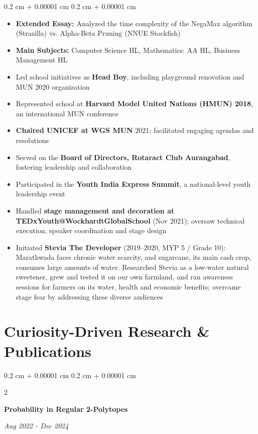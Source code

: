 \documentclass[10pt, letterpaper]{article}
\newenvironment{highlights}{
    \begin{itemize}[
        topsep=0.10 cm,
        parsep=0.10 cm,
        partopsep=0pt,
        itemsep=0pt,
        leftmargin=0.4 cm + 10pt
    ]
}{
    \end{itemize}
} %
\newenvironment{onecolentry}{
    \begin{adjustwidth}{
        0.2 cm + 0.00001 cm
    }{
        0.2 cm + 0.00001 cm
    }
}{
    \end{adjustwidth}
} %
\newenvironment{twocolentry}[2][]{
    \onecolentry
    \def\secondColumn{#2}
    \setcolumnwidth{\fill, 4.5 cm}
    \begin{paracol}{2}
}{
    \switchcolumn \raggedleft \secondColumn
    \end{paracol}
    \endonecolentry
} %
\begin{document}
        \begin{onecolentry}
            \begin{highlights}
                \item \textbf{Extended Essay:} Analyzed the time complexity of the NegaMax algorithm (Strazilla) vs. Alpha-Beta Pruning (NNUE Stockfish)
                \item \textbf{Main Subjects:} Computer Science HL, Mathematics: AA HL, Business Management HL
                \item Led school initiatives as \textbf{Head Boy}, including playground renovation and MUN 2020 organization
                \item Represented school at \textbf{Harvard Model United Nations (HMUN) 2018}, an international MUN conference
                \item \textbf{Chaired UNICEF at WGS MUN} 2021; facilitated engaging agendas and resolutions
                \item Served on the \textbf{Board of Directors, Rotaract Club Aurangabad}, fostering leadership and collaboration
                \item Participated in the \textbf{Youth India Express Summit}, a national-level youth leadership event
                \item Handled \textbf{stage management and decoration at TEDxYouth@WockhardtGlobalSchool} (Nov 2021); oversaw technical execution, speaker coordination and stage design
                \item Initiated \textbf{Stevia The Developer} (2019–2020, MYP 5 / Grade 10): Marathwada faces chronic water scarcity, and sugarcane, its main cash crop, consumes large amounts of water. Researched Stevia as a low-water natural sweetener, grew and tested it on our own farmland, and ran awareness sessions for farmers on its water, health and economic benefits; overcame stage fear by addressing these diverse audiences
            \end{highlights} 
        \end{onecolentry}


\section{Curiosity-Driven Research \& Publications}
        
\begin{twocolentry}{
    \textit{Aug 2022 - Dec 2024}
}
    \textbf{Probability in Regular 2-Polytopes}

    \vspace{0.10 cm}
\end{twocolentry}
\end{document}
